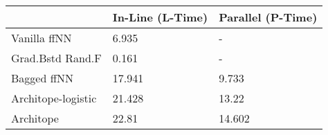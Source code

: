 \begin{tabular}{lll}
\toprule
{} & In-Line (L-Time) & Parallel (P-Time) \\
\midrule
Vanilla ffNN       &            6.935 &                 - \\
Grad.Bstd Rand.F   &            0.161 &                 - \\
Bagged ffNN        &           17.941 &             9.733 \\
Architope-logistic &           21.428 &             13.22 \\
Architope          &            22.81 &            14.602 \\
\bottomrule
\end{tabular}
